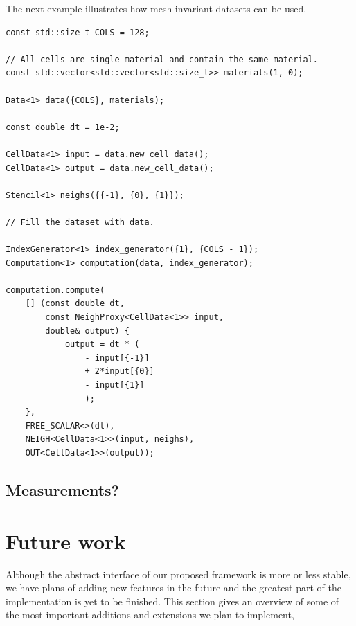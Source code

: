 \documentclass[fontsize=11pt, appendixprefix=true]{scrreprt}
\begin{document}
The next example illustrates how mesh-invariant datasets can be used.

\begin{lstlisting}
const std::size_t COLS = 128;

// All cells are single-material and contain the same material.
const std::vector<std::vector<std::size_t>> materials(1, 0);

Data<1> data({COLS}, materials);

const double dt = 1e-2;

CellData<1> input = data.new_cell_data();
CellData<1> output = data.new_cell_data();

Stencil<1> neighs({{-1}, {0}, {1}});

// Fill the dataset with data.

IndexGenerator<1> index_generator({1}, {COLS - 1});
Computation<1> computation(data, index_generator);

computation.compute(
    [] (const double dt,
        const NeighProxy<CellData<1>> input,
        double& output) {
            output = dt * (
                - input[{-1}]
                + 2*input[{0}]
                - input[{1}]
                );
	},
	FREE_SCALAR<>(dt),
	NEIGH<CellData<1>>(input, neighs),
	OUT<CellData<1>>(output));
\end{lstlisting}



\section{Measurements?}


\chapter{Future work}

Although the abstract interface of our proposed framework is more or less
stable, we have plans of adding new features in the future and the greatest part
of the implementation is yet to be finished. This section gives an overview of
some of the most important additions and extensions we plan to implement,
\end{document}
